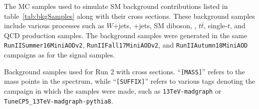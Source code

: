 The MC samples used to simulate SM background contributions listed in table~\ref{tab:bkgSamples} along with their cross sections. %
These background samples include various processes such as $W$+jets, \DY+jets, SM diboson, \bbbar, $t\bar{t}$, single-$t$, and QCD production samples.
The background samples were generated in the same \texttt{RunIISummer16MiniAODv2}, \texttt{RunIIFall17MiniAODv2}, and \texttt{RunIIAutumn18MiniAOD} campaigns as for the signal samples.

\begin{table}
  \centering
  
  \caption{
    Background samples used for Run 2 with cross sections.
    ``\texttt{[MASS]}'' refers to the mass points in the \MVV spectrum, while ``\texttt{[SUFFIX]}'' refers to various tags denoting the campaign in which the samples were made, such as \texttt{13TeV-madgraph} or \texttt{TuneCP5\_13TeV-madgraph-pythia8}.
  }
  \label{tab:bkgSamples}
\end{table}

%  

%  
